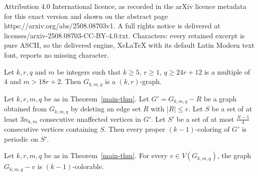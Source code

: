 \documentclass[10pt,a4paper]{amsart}
\begin{document}
Attribution 4.0 International licence, as recorded in the arXiv licence metadata for this exact version and shown on the abstract page https://arxiv.org/abs/2508.08703v1. A full rights notice is delivered at licenses/arxiv-2508.08703-CC-BY-4.0.txt. Characters: every retained excerpt is pure ASCII, so the delivered engine, XeLaTeX with its default Latin Modern text font, reports no missing character.
    \begin{theorem}\label{main-thm}
    Let $k , r, q$ and $m$ be integers such that $k\ge 5$, $r\ge 1$, $q \geq 24r + 12$ is a multiple of $4$ and $m > 18r+2$. Then $G_{k, m, q}$ is a $(k,r)$-graph.
    \end{theorem}

    \begin{lemma}\label{partial-periodicity-lemma}
        Let $k, r, m, q$ be as in Theorem~\ref{main-thm}. Let $G'=G_{k, m, q}-R$ be a graph obtained from $G_{k, m, q}$ by deleting an edge set $R$ with $|R|\le r$. Let $S$ be a set of at least $3n_{k, m}$ consecutive unaffected vertices in $G'$. Let $S'$ be a set of at most $\frac{N-1}{4}$ consecutive vertices containing $S$. Then every proper $(k - 1)$-coloring of $G'$ is periodic on $S'$.
    \end{lemma}

    \begin{lemma}[Colorability]\label{colorability-lemma}
        Let $k, r, m, q$ be as in Theorem~\ref{main-thm}. For every $v \in V(G_{k, m, q})$, the graph $G_{k, m, q} - v$ is $(k-1)$-colorable.
    \end{lemma}
\end{document}
